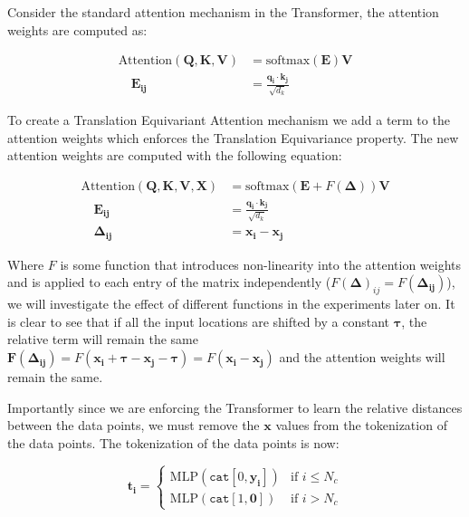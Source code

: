 \documentclass[../../main.tex]{subfiles}
\begin{document}
Consider the standard attention mechanism in the Transformer, the attention weights are computed as:


\begin{align}
	\text{Attention}(\bm{Q}, \bm{K}, \bm{V}) &= \text{softmax}\left(\bm{E} \right) \bm{V}\\
	 \quad \bm{E_{ij}} &= \frac{\bm{q_i} \cdot \bm{k_j}}{\sqrt{d_k}}
\end{align}

To create a Translation Equivariant Attention mechanism we add a term to the attention weights which enforces the Translation Equivariance property. The new attention weights are computed with the following equation:

\begin{align}
	\label{eq:relative-attention}
	\text{Attention}(\bm{Q}, \bm{K}, \bm{V}, \bm{X}) &= \text{softmax}\left(\bm{E} + F(\bm{\Delta}) \right) \bm{V}\\
	\quad \bm{E_{ij}} &= \frac{\bm{q_i} \cdot \bm{k_j}}{\sqrt{d_k}}\\
	 \quad \bm{\Delta_{ij}} &= \bm{x_i} - \bm{x_j}
\end{align}

Where $F$ is some function that introduces non-linearity into the attention weights and is applied to each entry of the matrix independently ($F(\bm{\Delta})_{ij} = F(\bm{\Delta_{ij}})$), we will investigate the effect of different functions in the experiments later on. It is clear to see that if all the input locations are shifted by a constant $\bm{\tau}$, the relative term will remain the same $\bm{F(\Delta_{ij})} = F(\bm{x_i} + \bm{\tau} - \bm{x_j} - \bm{\tau}) = F(\bm{x_i} - \bm{x_j})$ and the attention weights will remain the same.

Importantly since we are enforcing the Transformer to learn the relative distances between the data points, we must remove the $\bm{x}$ values from the tokenization of the data points. The tokenization of the data points is now:

\[
	\bm{t_i} = \begin{cases}
		\text{MLP}(\texttt{cat}[0, \bm{y_i}]) & \text{if } i \leq N_c \\
		\text{MLP}(\texttt{cat}[1, \bm{ 0}]) & \text{if } i > N_c
	\end{cases}
\]


\end{document}
